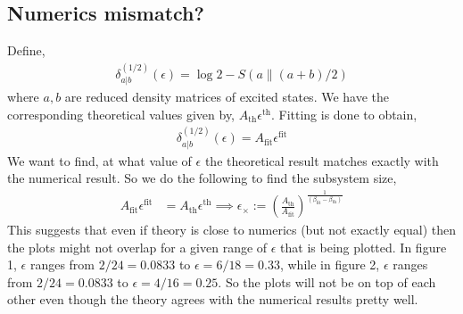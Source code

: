 \documentclass[11pt]{article}
\newcommand{\ep}{\epsilon}
\newcommand{\lb}{\left(}
\newcommand{\rb}{\right)}
\begin{document}
\subsection{Numerics mismatch?}
Define,
\begin{align}
    \delta_{a|b}^{(1/2)}(\ep)  = \log 2 - S(a\| (a+b)/2)
\end{align}
where $a,b$ are reduced density matrices of excited states. We have the corresponding theoretical values given by, $A_{\text{th}}\ep^{\text{th}}$. Fitting is done to obtain,
\begin{align}
    \delta_{a|b}^{(1/2)}(\ep)  = A_{\text{fit}}\ep^{\text{fit}}
\end{align}
We want to find, at what value of $\ep$  the theoretical result matches exactly with the numerical result. So we do the following to find the subsystem size,
\begin{align}
    A_{\text{fit}}\ep^{\text{fit}} &= A_{\text{th}}\ep^{\text{th}} \implies
    \ep_\times := \lb\frac{A_{\text{th}}}{A_{\text{fit}}}\rb^{\frac{1}{(\beta_{\text{fit}} - \beta_{\text{th}})}}
\end{align}
This suggests that even if theory is close to numerics (but not exactly equal) then the plots might not overlap for a given range of $\ep$ that is being plotted. 
In figure 1, $\ep$ ranges from $2/24 = 0.0833$ to $\ep = 6/18 = 0.33$, while in figure 2, $\ep$ ranges from $2/24 = 0.0833$ to $\ep = 4/16 = 0.25$.
So the plots will not be on top of each other even though the theory agrees with the numerical results pretty well. 
\end{document}
